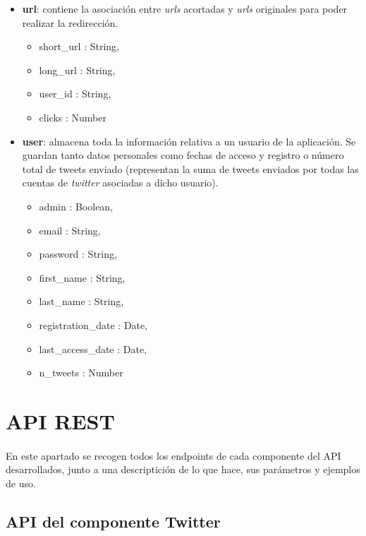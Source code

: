 \documentclass[a4paper]{article}
\begin{document}
\begin{itemize}
	\item \textbf{url}: contiene la asociación entre \textit{urls} acortadas y \textit{urls} originales para poder realizar la redirección.
	
		\begin{itemize}
		\item short\_url : String,
		\item long\_url : String,
		\item user\_id : String,
		\item clicks : Number
		\end{itemize}
	
	\item \textbf{user}: almacena toda la información relativa a un usuario de la aplicación. Se guardan tanto datos personales como fechas de acceso y registro o número total de tweets enviado (representan la suma de tweets enviados por todas las cuentas de \textit{twitter} asociadas a dicho usuario).
	
		\begin{itemize}
		\item admin : Boolean,
		\item email : String,
		\item password : String,
		\item first\_name : String,
		\item last\_name : String,
		\item registration\_date : Date,
		\item last\_access\_date : Date,
		\item n\_tweets : Number		
		\end{itemize}
	
	\end{itemize}

\newpage
\section{API REST}

	\paragraph{} En este apartado se recogen todos los endpoints de cada componente del API desarrollados, junto a una descriptición de lo que hace, sus parámetros y ejemplos de uso.
	
	\subsection{API del componente Twitter}
	
\end{document}
